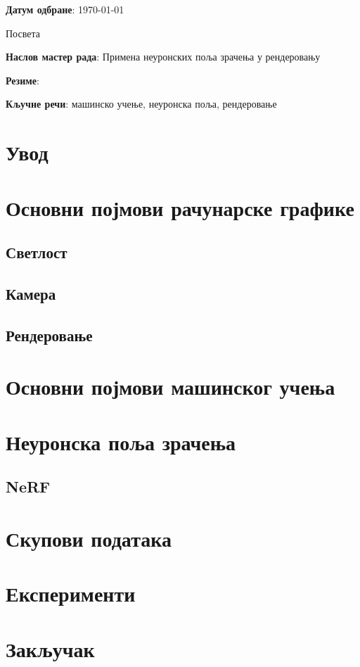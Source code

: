 \documentclass[12pt, a4paper]{article}
\begin{document}
\noindent \textbf{Датум одбране}: \today
\hspace{0pt}
\vfill

\newpage
\thispagestyle{empty}
Посвета

\newpage
\thispagestyle{empty}
\noindent \textbf{Наслов мастер рада}: Примена неуронских поља зрачења у рендеровању

\noindent \textbf{Резиме}:

\noindent \textbf{Кључне речи}: машинско учење, неуронска поља, рендеровање

\newpage
\tableofcontents
\newpage

\section{Увод}
\section{Основни појмови рачунарске графике}
\subsection{Светлост}
\subsection{Камера}
\subsection{Рендеровање}
\section{Основни појмови машинског учења}
\section{Неуронска поља зрачења}
\subsection{NeRF}
\section{Скупови података}
\section{Експерименти}
\section{Закључак}
\end{document}

